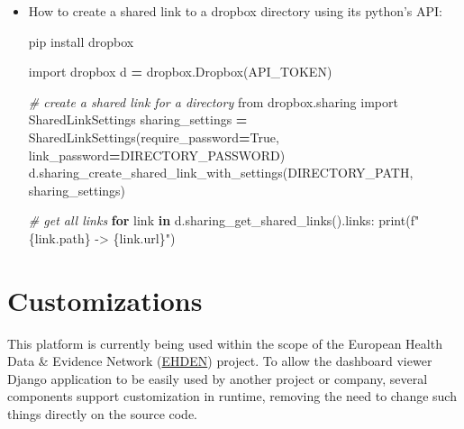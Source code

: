 \documentclass[
]{book}
\newenvironment{Shaded}{\begin{snugshade}}{\end{snugshade}}
\newcommand{\BuiltInTok}[1]{#1}
\newcommand{\CommentTok}[1]{\textcolor[rgb]{0.56,0.35,0.01}{\textit{#1}}}
\newcommand{\ControlFlowTok}[1]{\textcolor[rgb]{0.13,0.29,0.53}{\textbf{#1}}}
\newcommand{\ExtensionTok}[1]{#1}
\newcommand{\ImportTok}[1]{#1}
\newcommand{\KeywordTok}[1]{\textcolor[rgb]{0.13,0.29,0.53}{\textbf{#1}}}
\newcommand{\NormalTok}[1]{#1}
\newcommand{\OperatorTok}[1]{\textcolor[rgb]{0.81,0.36,0.00}{\textbf{#1}}}
\newcommand{\SpecialCharTok}[1]{\textcolor[rgb]{0.00,0.00,0.00}{#1}}
\newcommand{\SpecialStringTok}[1]{\textcolor[rgb]{0.31,0.60,0.02}{#1}}
\newcommand{\VariableTok}[1]{\textcolor[rgb]{0.00,0.00,0.00}{#1}}
\begin{document}
\begin{itemize}
\item
  How to create a shared link to a dropbox directory using its python's API:

\begin{Shaded}
\begin{Highlighting}[]
\ExtensionTok{pip}\NormalTok{ install dropbox}
\end{Highlighting}
\end{Shaded}

\begin{Shaded}
\begin{Highlighting}[]
\ImportTok{import}\NormalTok{ dropbox}
\NormalTok{d }\OperatorTok{=}\NormalTok{ dropbox.Dropbox(API\_TOKEN)}

\CommentTok{\# create a shared link for a directory}
\ImportTok{from}\NormalTok{ dropbox.sharing }\ImportTok{import}\NormalTok{ SharedLinkSettings}
\NormalTok{sharing\_settings }\OperatorTok{=}\NormalTok{ SharedLinkSettings(require\_password}\OperatorTok{=}\VariableTok{True}\NormalTok{, link\_password}\OperatorTok{=}\NormalTok{DIRECTORY\_PASSWORD)}
\NormalTok{d.sharing\_create\_shared\_link\_with\_settings(DIRECTORY\_PATH, sharing\_settings)}

\CommentTok{\# get all links}
\ControlFlowTok{for}\NormalTok{ link }\KeywordTok{in}\NormalTok{ d.sharing\_get\_shared\_links().links:}
    \BuiltInTok{print}\NormalTok{(}\SpecialStringTok{f"}\SpecialCharTok{\{}\NormalTok{link}\SpecialCharTok{.}\NormalTok{path}\SpecialCharTok{\}}\SpecialStringTok{ {-}\textgreater{} }\SpecialCharTok{\{}\NormalTok{link}\SpecialCharTok{.}\NormalTok{url}\SpecialCharTok{\}}\SpecialStringTok{"}\NormalTok{)}
\end{Highlighting}
\end{Shaded}
\end{itemize}

\hypertarget{customizations}{%
\chapter{Customizations}\label{customizations}}

This platform is currently being used within the scope of the European Health Data \& Evidence Network (\href{https://www.ehden.eu/}{EHDEN}) project.
To allow the dashboard viewer Django application to be easily used by another project or company, several components support customization in runtime, removing the need to change such things directly on the source code.
\end{document}

